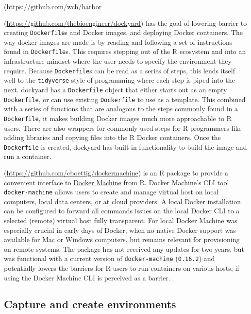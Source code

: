 \textbf{} (\url{https://github.com/wch/harbor}

\textbf{}
(\url{https://github.com/thebioengineer/dockyard}) has the goal of
lowering barrier to creating \texttt{Dockerfile}s and Docker images, and
deploying Docker containers. The way docker images are made is by
reading and following a set of instructions found in
\texttt{Dockerfile}s. This requires stepping out of the R ecosystem and
into an infrastructure mindset where the user needs to specify the
environment they require. Because \texttt{Dockerfile}s can be read as a
series of steps, this lends itself well to the \texttt{tidyverse} style
of programming where each step is piped into the next. dockyard has a
\texttt{Dockerfile} object that either starts out as an empty
\texttt{Dockerfile}, or can use existing \texttt{Dockerfile} to use as a
template. This combined with a series of functions that are analogous to
the steps commonly found in a \texttt{Dockerfile}, it makes building
Docker images much more approachable to R users. There are also wrappers
for commonly used steps for R programmers like adding libraries and
copying files into the R Docker containers. Once the \texttt{Dockerfile}
is created, dockyard has built-in functionality to build the image and
run a container.

\textbf{}
(\url{https://github.com/cboettig/dockermachine}) is an R package to
provide a convenient interface to
\href{https://docs.docker.com/machine/overview/}{Docker Machine} from R.
Docker Machine's CLI tool \texttt{docker-machine} allows users to create
and manage virtual host on local computers, local data centers, or at
cloud providers. A local Docker installation can be configured to
forward all commands issues on the local Docker CLI to a selected
(remote) virtual host fully transparent. For local Docker Machine was
especially crucial in early days of Docker, when no native Docker
support was available for Mac or Windows computers, but remains relevant
for provisioning on remote systems. The package has not received any
updates for two years, but was functional with a current version of
\texttt{docker-machine} (\texttt{0.16.2}) and potentially lowers the
barriers for R users to run containers on various hosts, if using the
Docker Machine CLI is perceived as a barrier.

\hypertarget{capture-and-create-environments-nuest}{%
\subsection{\texorpdfstring{Capture and create environments
\citep{nuest}}{Capture and create environments {[}@nuest{]}}}\label{capture-and-create-environments-nuest}}

